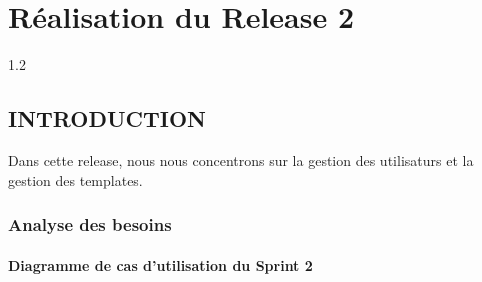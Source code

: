 \chapter{Réalisation du Release 2 }
\begin{spacing}{1.2}
\minitoc
\thispagestyle{MyStyle}
\end{spacing}
\newpage

\section{INTRODUCTION}
 Dans cette release, nous nous concentrons sur la gestion des utilisaturs et la gestion des templates.
 \subsection{ Analyse des besoins}
\subsubsection{Diagramme de cas d'utilisation du Sprint 2}